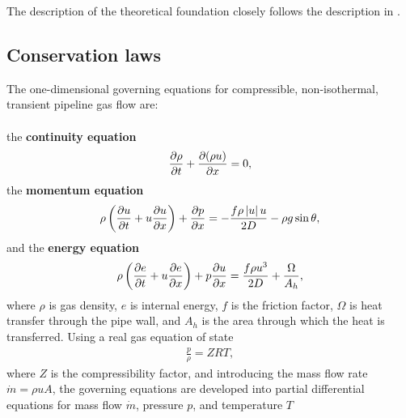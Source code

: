 The description of the theoretical foundation closely follows the description in \cite{Chaczykowski2017}. 

\subsection{Conservation laws}
The one-dimensional governing equations for compressible, non-isothermal, transient pipeline gas flow are: \\\\
the \textbf{continuity equation}
\begin{align}
    \pdt{\rho} + \pdx{(\rho u)} = 0
, \label{eq:contEq}
\end{align}
the \textbf{momentum equation} \cite{Daneshyar1976OneDimensional}
\begin{align}
    \rho\del{\pdt{u} + u \pdx{u}} + \pdx{p} = -\frac{f\rho \abs{u} u}{2D} - \rho g \sin \theta
, \label{eq:momEq}
\end{align}
and the \textbf{energy equation} \cite{White2006Viscous}
\begin{align}
    \rho\del{\pdt{e} + u\pdx{e}} + p\pdx{u} = \frac{f\rho u^3}{2D} + \frac{\Omega}{A_h}
, \label{eq:enEq}
\end{align}
where $\rho$ is gas density, $e$ is internal energy, $f$ is the friction factor, $\Omega$ is heat transfer through the pipe wall, and $A_h$ is the area through which the heat is transferred. %
Using a real gas equation of state
\begin{align}
    \frac{p}{\rho} = ZRT
,
\label{eq:equationOfState}
\end{align}
where $Z$ is the compressibility factor, and introducing the mass flow rate $\dot m = \rho u A$, the governing equations are developed into partial differential equations for mass flow $\dot m$, pressure $p$, and temperature $T$
